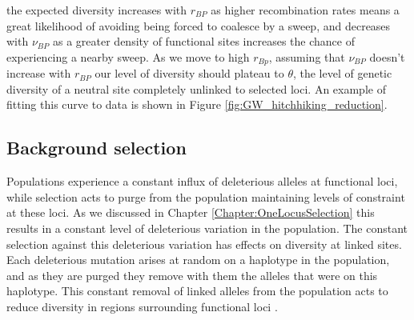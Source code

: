 the expected diversity increases with $r_{BP}$ as higher recombination rates means a great likelihood of avoiding being forced to coalesce by a sweep, and decreases with $\nu_{BP}$ as a greater density of functional sites increases the chance of experiencing a nearby sweep. As we move to high $r_{Bp}$, assuming that $\nu_{BP}$ doesn't increase with $r_{BP}$ our level of diversity should plateau to $\theta$, the level of genetic diversity of a neutral site completely unlinked to selected loci. An example of fitting this curve to data is shown in Figure \ref{fig:GW_hitchhiking_reduction}. 

\subsection{Background selection}

Populations experience a constant influx of
deleterious alleles at functional loci, while selection acts to purge
from the population maintaining levels of constraint at these loci. As
we discussed in Chapter \ref{Chapter:OneLocusSelection} this results
in a constant level of deleterious variation in the population. The
constant selection against this deleterious variation has effects on diversity at linked
sites. Each deleterious mutation arises at random on a haplotype in the
population, and as they are purged they remove with them the alleles that were on this
haplotype. This constant removal of linked alleles from the population
acts to reduce diversity in regions surrounding functional loci \citep{Hudson:95b,Nordborg:96}. 

